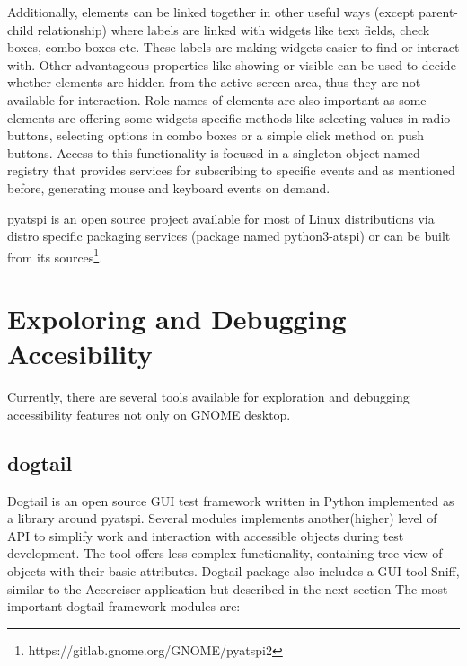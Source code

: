 Additionally, elements can be linked together in other useful ways (except parent-child relationship) where labels are linked with widgets like text fields, check boxes, combo boxes etc. These labels are making widgets easier to find or interact with. Other advantageous properties like showing or visible can be used to decide whether elements are hidden from the active screen area, thus they are not available for interaction. Role names of elements are also important as some elements are offering some widgets specific methods like selecting values in radio buttons, selecting options in combo boxes or a simple click method on push buttons. Access to this functionality is focused in a singleton object named registry that provides services for subscribing to specific events and as mentioned before, generating mouse and keyboard events on demand.

pyatspi is an open source project available for most of Linux distributions via distro specific packaging services (package named python3-atspi) or can be built from its sources\footnote{https://gitlab.gnome.org/GNOME/pyatspi2}.

\section{Expoloring and Debugging Accesibility}
Currently, there are several tools available for exploration and debugging accessibility features not only on GNOME desktop. 
\subsection{dogtail}
Dogtail is an open source GUI test framework written in Python implemented as a library around pyatspi. Several modules implements another(higher) level of API to simplify work and interaction with accessible objects during test development. The tool offers less complex functionality, containing tree view of objects with their basic attributes\cite{dogtail_doc}. Dogtail package also includes a GUI tool Sniff, similar to the Accerciser application but described in the next section
The most important dogtail framework modules are:

